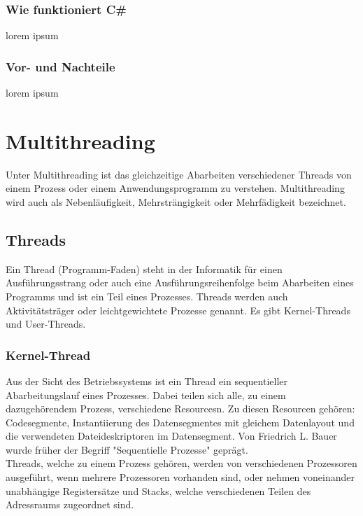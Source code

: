 \documentclass[12pt,a4paper]{report}
\begin{document}
\subsubsection{Wie funktioniert C\#}
lorem ipsum
\subsubsection{Vor- und Nachteile}
lorem ipsum
\section{Multithreading}
Unter Multithreading ist das gleichzeitige Abarbeiten verschiedener Threads von einem Prozess oder einem Anwendungsprogramm zu verstehen. Multithreading wird auch als Nebenläufigkeit, Mehrsträngigkeit oder Mehrfädigkeit bezeichnet.

\subsection{Threads}
Ein Thread (Programm-Faden) steht in der Informatik für einen Ausführungsstrang oder auch eine Ausführungsreihenfolge beim Abarbeiten eines Programms und ist ein Teil eines Prozesses. Threads werden auch Aktivitätsträger oder leichtgewichtete Prozesse genannt. Es gibt Kernel-Threads und User-Threads.

\subsubsection{Kernel-Thread}
Aus der Sicht des Betriebssystems ist ein Thread ein sequentieller Abarbeitungslauf eines Prozesses. Dabei teilen sich alle, zu einem dazugehörendem Prozess, verschiedene Resourcesn. Zu diesen Resourcen gehören: Codesegmente, Instantiierung des Datensegmentes mit gleichem Datenlayout und die verwendeten Dateideskriptoren im Datensegment. Von Friedrich L. Bauer wurde früher der Begriff "Sequentielle Prozesse" geprägt.\\

Threads, welche zu einem Prozess gehören, werden von verschiedenen Prozessoren ausgeführt, wenn mehrere Prozessoren vorhanden sind, oder nehmen voneinander unabhängige Registersätze und Stacks, welche verschiedenen Teilen des Adressraums zugeordnet sind.\\
\end{document}
